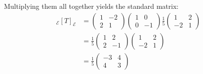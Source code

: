 \documentclass[../linear_algebra_and_groups.tex]{subfiles}
\begin{document}
\begin{example}
    Multiplying them all together yields the standard matrix:
    \begin{align*} 
    {}_\mathcal{E}[T]_\mathcal{E} &= \begin{pmatrix} 1 & -2 \\ 2 & 1 \end{pmatrix} \begin{pmatrix} 1 & 0 \\ 0 & -1 \end{pmatrix} \frac{1}{5} \begin{pmatrix} 1 & 2 \\ -2 & 1 \end{pmatrix} \\
    &= \frac{1}{5} \begin{pmatrix} 1 & 2 \\ 2 & -1 \end{pmatrix} \begin{pmatrix} 1 & 2 \\ -2 & 1 \end{pmatrix} \\
    &= \frac{1}{5} \begin{pmatrix} -3 & 4 \\ 4 & 3 \end{pmatrix} 
    \end{align*}
\end{example}
\end{document}
